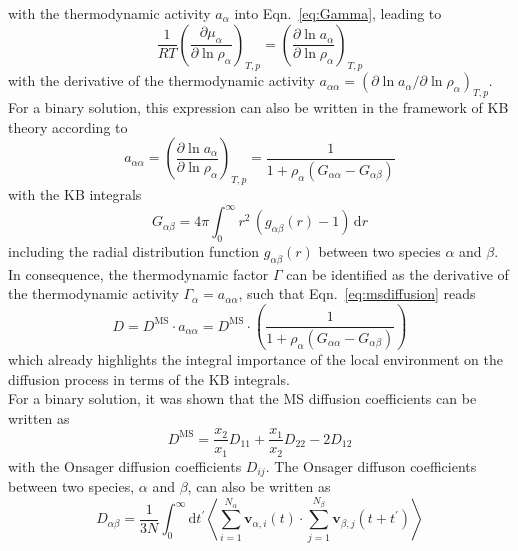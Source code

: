 \documentclass[aip,jcp,reprint]{revtex4-1}
\begin{document}
with the thermodynamic activity $a_{\alpha}$ into Eqn.~\eqref{eq:Gamma}, leading to
\begin{equation}
	\label{eq:KBGamma}
	\frac{1}{RT}\left(\frac{\partial \mu_{\alpha}}{\partial \ln \rho_{\alpha}}\right)_{T,p}=\left(\frac{\partial \ln a_{\alpha}}{\partial \ln \rho_{\alpha}}\right)_{T,p}
\end{equation}
with the derivative of the  thermodynamic activity  $a_{\alpha\alpha} = \left(\partial \ln a_{\alpha}/\partial \ln \rho_{\alpha}\right)_{T,p}$. For a binary solution, this expression can also be written in the framework of KB theory \cite{ben13a,smiatek18a,pierce08a,smith06}
according to
\begin{equation}
	\label{eq:act}
	a_{\alpha\alpha} = \left(\frac{\partial \ln a_{\alpha}}{\partial \ln \rho_{\alpha}}\right)_{T,p} = \frac{1}{1+\rho_{\alpha}(G_{\alpha\alpha}-G_{\alpha\beta})}
\end{equation}
with the KB integrals
\begin{equation}
	\label{eq:KBI}
	G_{\alpha\beta} = 4\pi \int_0^{\infty}r^2\, (g_{\alpha\beta}(r) - 1)\,\textrm{d}r
\end{equation}
including the radial distribution function $g_{\alpha\beta}(r)$ between two species $\alpha$ and $\beta$. In consequence, the thermodynamic factor $\Gamma$ can be identified as the derivative of the thermodynamic activity $\Gamma_{\alpha} = a_{\alpha\alpha}$, such that Eqn.~\eqref{eq:msdiffusion} reads
\begin{equation}
	\label{eq:DMS}
	D= D^{\text{MS}}\cdot a_{\alpha\alpha} =  D^{\text{MS}}\cdot \left( \frac{1}{1+\rho_{\alpha}(G_{\alpha\alpha}-G_{\alpha\beta})}\right)
\end{equation}
which already highlights the integral importance of the local environment on the diffusion process in terms of the KB integrals. \\
For a binary solution, it was shown that the MS diffusion coefficients can be written as \cite{liu13a,rosenberger20a}
\begin{equation}
	\label{eq:comp}
	D^{\text{MS}} = \frac{x_2}{x_1}D_{11} + \frac{x_1}{x_2}D_{22} - 2D_{12}
\end{equation}
with the Onsager diffusion coefficients $D_{ij}$.
The Onsager diffuson coefficients between two species, $\alpha$ and $\beta$, can also be written as \cite{liu13a}
\begin{equation}
	D_{\alpha\beta}= \frac{1}{3N}\int_0^{\infty}\textrm{d}t^{\prime}\left \langle \sum_{i=1}^{N_{\alpha}}\mathbf{v}_{\alpha,i}(t)\cdot \sum_{j=1}^{N_{\beta}}\mathbf{v}_{\beta,j}(t+t^{\prime})\right\rangle
\end{equation}
\end{document}
